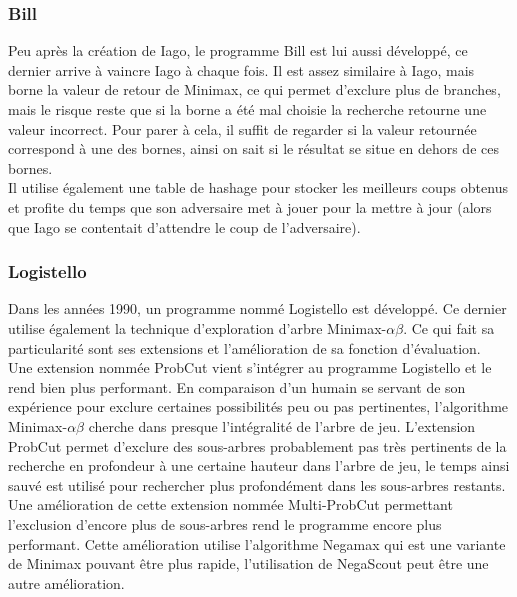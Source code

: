 \documentclass[10pt,a4paper]{article}
\begin{document}
\subsubsection{Bill}
Peu après la création de Iago, le programme Bill\cite{LM86} est lui aussi développé, ce dernier arrive à vaincre Iago à chaque fois. Il est assez similaire à Iago, mais borne la valeur de retour de Minimax, ce qui permet d'exclure plus de branches, mais le risque reste que si la borne a été mal choisie la recherche retourne une valeur incorrect. Pour parer à cela, il suffit de regarder si la valeur retournée correspond à une des bornes, ainsi on sait si le résultat se situe en dehors de ces bornes.\\

Il utilise également une table de hashage pour stocker les meilleurs coups obtenus et profite du temps que son adversaire met à jouer pour la mettre à jour (alors que Iago se contentait d'attendre le coup de l'adversaire).

\subsubsection{Logistello}

Dans les années 1990, un programme nommé Logistello\cite{Bur95a} est développé. Ce dernier utilise également la technique d'exploration d'arbre Minimax-$\alpha\beta$. Ce qui fait sa particularité sont ses extensions et l'amélioration de sa fonction d'évaluation.\\

Une extension nommée ProbCut\cite{Bur95b} vient s'intégrer au programme Logistello et le rend bien plus performant. En comparaison d'un humain se servant de son expérience pour exclure certaines possibilités peu ou pas pertinentes, l'algorithme Minimax-$\alpha\beta$ cherche dans presque l'intégralité de l'arbre de jeu. L'extension ProbCut permet d'exclure des sous-arbres probablement pas très pertinents de la recherche en profondeur à une certaine hauteur dans l'arbre de jeu, le temps ainsi sauvé est utilisé pour rechercher plus profondément dans les sous-arbres restants.\\

Une amélioration de cette extension nommée Multi-ProbCut\cite{Bur97a} permettant l'exclusion d'encore plus de sous-arbres rend le programme encore plus performant. Cette amélioration utilise l'algorithme Negamax qui est une variante de Minimax pouvant être plus rapide, l'utilisation de NegaScout peut être une autre amélioration.\\
\end{document}
